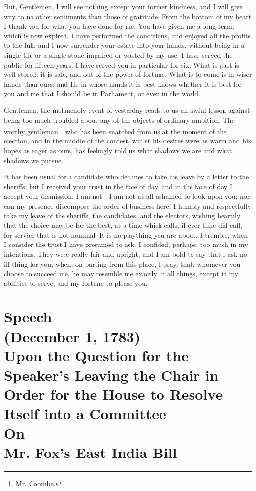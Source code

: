 But, Gentlemen, I will see nothing except your former kindness, and I will give way to no other sentiments than those of gratitude. From the bottom of my heart I thank you for what you have done for me. You have given me a long term, which is now expired. I have performed the conditions, and enjoyed all the profits to the full; and I now surrender your estate into your hands, without being in a single tile or a single stone impaired or wasted by my use. I have served the public for fifteen years. I have served you in particular for six. What is past is well stored; it is safe, and out of the power of fortune. What is to come is in wiser hands than ours; and He in whose hands it is best knows whether it is best for you and me that I should be in Parliament, or even in the world.

Gentlemen, the melancholy event of yesterday reads to us an awful lesson against being too much troubled about any of the objects of ordinary ambition. The worthy gentleman 
\footnote{ Mr. Coombe.}
 who has been snatched from us at the moment of the election, and in the middle of the contest, whilst his desires were as warm and his hopes as eager as ours, has feelingly told us what shadows we are and what shadows we pursue.

It has been usual for a candidate who declines to take his leave by a letter to the sheriffs: but I received your trust in the face of day, and in the face of day I accept your dismission. I am not—I am not at all ashamed to look upon you; nor can my presence discompose the order of business here. I humbly and respectfully take my leave of the sheriffs, the candidates, and the electors, wishing heartily that the choice may be for the best, at a time which calls, if ever time did call, for service that is not nominal. It is no plaything you are about. I tremble, when I consider the trust I have presumed to ask. I confided, perhaps, too much in my intentions. They were really fair and upright; and I am bold to say that I ask no ill thing for you, when, on parting from this place, I pray, that, whomever you choose to succeed me, he may resemble me exactly in all things, except in my abilities to serve, and my fortune to please you.




\chapter*[Speech on Mr. Fox's East India Bill]{
Speech
\\(December 1, 1783)
\\Upon
the Question for the Speaker's Leaving the Chair in Order for the House
to Resolve Itself into a Committee
\\On
\\Mr. Fox's East India Bill}

